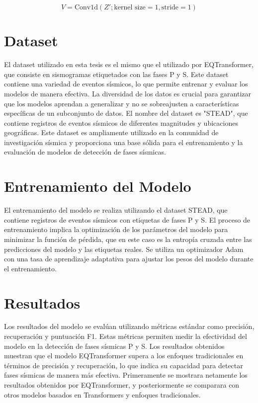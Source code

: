 \begin{equation}
V = \text{Conv1d}(Z'; \text{kernel size} = 1, \text{stride} = 1)
\label{eq:value}
\end{equation}

\section{Dataset}
El dataset utilizado en esta tesis es el mismo que el utilizado por EQTransformer, que consiste en sismogramas etiquetados con las fases P y S. Este dataset contiene una variedad de eventos sísmicos, lo que permite entrenar y evaluar los modelos de manera efectiva. La diversidad de los datos es crucial para garantizar que los modelos aprendan a generalizar y no se sobreajusten a características específicas de un subconjunto de datos. El nombre del dataset es "STEAD", que contiene registros de eventos sísmicos de diferentes magnitudes y ubicaciones geográficas. Este dataset es ampliamente utilizado en la comunidad de investigación sísmica y proporciona una base sólida para el entrenamiento y la evaluación de modelos de detección de fases sísmicas.

\section{Entrenamiento del Modelo}

El entrenamiento del modelo se realiza utilizando el dataset STEAD, que contiene registros de eventos sísmicos con etiquetas de fases P y S. El proceso de entrenamiento implica la optimización de los parámetros del modelo para minimizar la función de pérdida, que en este caso es la entropía cruzada entre las predicciones del modelo y las etiquetas reales. Se utiliza un optimizador Adam con una tasa de aprendizaje adaptativa para ajustar los pesos del modelo durante el entrenamiento.

\section{Resultados}

Los resultados del modelo se evalúan utilizando métricas estándar como precisión, recuperación y puntuación F1. Estas métricas permiten medir la efectividad del modelo en la detección de fases sísmicas P y S. Los resultados obtenidos muestran que el modelo EQTransformer supera a los enfoques tradicionales en términos de precisión y recuperación, lo que indica su capacidad para detectar fases sísmicas de manera más efectiva. Primeramente se mostrara netamente los resultados obtenidos por EQTransformer, y posteriormente se comparara con otros modelos basados en Transformers y enfoques tradicionales.

